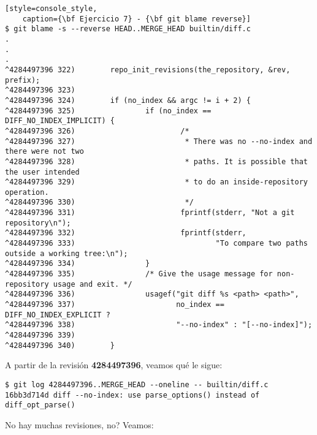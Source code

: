 \begin{lstlisting}[style=console_style,
	caption={\bf Ejercicio 7} - {\bf git blame reverse}]
$ git blame -s --reverse HEAD..MERGE_HEAD builtin/diff.c
.
.
.
^4284497396 322)        repo_init_revisions(the_repository, &rev, prefix);
^4284497396 323) 
^4284497396 324)        if (no_index && argc != i + 2) {
^4284497396 325)                if (no_index == DIFF_NO_INDEX_IMPLICIT) {
^4284497396 326)                        /*
^4284497396 327)                         * There was no --no-index and there were not two
^4284497396 328)                         * paths. It is possible that the user intended
^4284497396 329)                         * to do an inside-repository operation.
^4284497396 330)                         */
^4284497396 331)                        fprintf(stderr, "Not a git repository\n");
^4284497396 332)                        fprintf(stderr,
^4284497396 333)                                "To compare two paths outside a working tree:\n");
^4284497396 334)                }
^4284497396 335)                /* Give the usage message for non-repository usage and exit. */
^4284497396 336)                usagef("git diff %s <path> <path>",
^4284497396 337)                       no_index == DIFF_NO_INDEX_EXPLICIT ?
^4284497396 338)                       "--no-index" : "[--no-index]");
^4284497396 339) 
^4284497396 340)        }
\end{lstlisting}

A partir de la revisión {\bf 4284497396}, veamos qué le sigue:

\begin{lstlisting}[style=console_style,
	caption={\bf Ejercicio 7} - revisiones que verificar]
$ git log 4284497396..MERGE_HEAD --oneline -- builtin/diff.c
16bb3d714d diff --no-index: use parse_options() instead of diff_opt_parse()
\end{lstlisting}

No hay muchas revisiones, no? Veamos:

